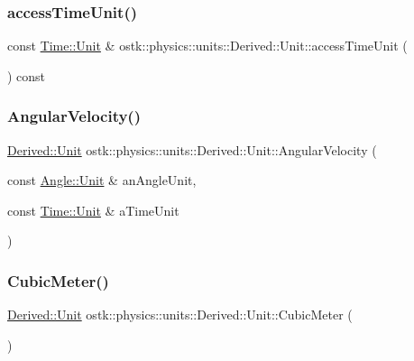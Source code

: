 \subsubsection{\texorpdfstring{access\+Time\+Unit()}{accessTimeUnit()}}
{\footnotesize\ttfamily const \hyperlink{classostk_1_1physics_1_1units_1_1_time_aa961f0dbca7ec297e19e15e0dfa3bb4a}{Time\+::\+Unit} \& ostk\+::physics\+::units\+::\+Derived\+::\+Unit\+::access\+Time\+Unit (\begin{DoxyParamCaption}{ }\end{DoxyParamCaption}) const}

\mbox{\label{classostk_1_1physics_1_1units_1_1_derived_1_1_unit_ae6790769634dedf4d2406a6bc1818cd3}} 
\subsubsection{\texorpdfstring{Angular\+Velocity()}{AngularVelocity()}}
{\footnotesize\ttfamily \hyperlink{classostk_1_1physics_1_1units_1_1_derived_1_1_unit}{Derived\+::\+Unit} ostk\+::physics\+::units\+::\+Derived\+::\+Unit\+::\+Angular\+Velocity (\begin{DoxyParamCaption}\item[{const \hyperlink{classostk_1_1physics_1_1units_1_1_angle_aea1f8018b1d378b9dee56959d8eb9def}{Angle\+::\+Unit} \&}]{an\+Angle\+Unit,  }\item[{const \hyperlink{classostk_1_1physics_1_1units_1_1_time_aa961f0dbca7ec297e19e15e0dfa3bb4a}{Time\+::\+Unit} \&}]{a\+Time\+Unit }\end{DoxyParamCaption})\hspace{0.3cm}{\ttfamily [static]}}

\mbox{\label{classostk_1_1physics_1_1units_1_1_derived_1_1_unit_ab09e64a438371b55e7052c783a17bfb3}} 
\subsubsection{\texorpdfstring{Cubic\+Meter()}{CubicMeter()}}
{\footnotesize\ttfamily \hyperlink{classostk_1_1physics_1_1units_1_1_derived_1_1_unit}{Derived\+::\+Unit} ostk\+::physics\+::units\+::\+Derived\+::\+Unit\+::\+Cubic\+Meter (\begin{DoxyParamCaption}{ }\end{DoxyParamCaption})\hspace{0.3cm}{\ttfamily [static]}}

